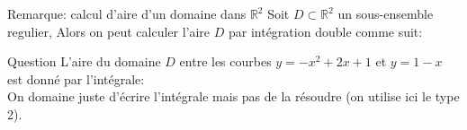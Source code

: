 \begin{parag}{Remarque: calcul d'aire d'un domaine dans $\mathbb{R}^{2}$}
    Soit $D \subset \mathbb{R}^{2}$ un sous-ensemble regulier, Alors on peut calculer l'aire $D$ par intégration double comme suit:
\end{parag}
\begin{parag}{Question}
    L'aire du domaine $D$ entre les courbes $y =  -x^2 + 2x +  1$ et $y = 1 - x$ est donné par l'intégrale:\\
    On domaine juste d'écrire l'intégrale mais pas de la résoudre (on utilise ici le type 2).
    

\end{parag}


